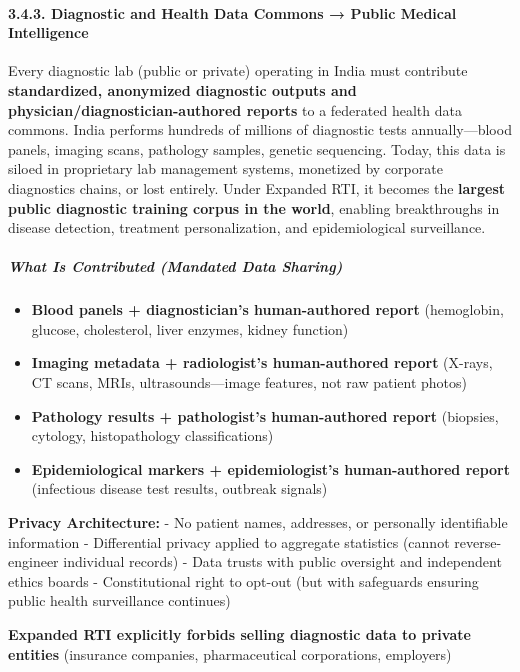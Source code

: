 \paragraph{3.4.3. Diagnostic and Health Data Commons → Public Medical
Intelligence}\label{diagnostic-and-health-data-commons-public-medical-intelligence}

Every diagnostic lab (public or private) operating in India must
contribute \textbf{standardized, anonymized diagnostic outputs and
physician/diagnostician-authored reports} to a federated health data
commons. India performs hundreds of millions of diagnostic tests
annually---blood panels, imaging scans, pathology samples, genetic
sequencing. Today, this data is siloed in proprietary lab management
systems, monetized by corporate diagnostics chains, or lost entirely.
Under Expanded RTI, it becomes the \textbf{largest public diagnostic
training corpus in the world}, enabling breakthroughs in disease
detection, treatment personalization, and epidemiological surveillance.

\subparagraph{What Is Contributed (Mandated Data
Sharing)}\label{what-is-contributed-mandated-data-sharing}

\begin{itemize}
\tightlist
\item
  \textbf{Blood panels + diagnostician's human-authored report}
  (hemoglobin, glucose, cholesterol, liver enzymes, kidney function)
\item
  \textbf{Imaging metadata + radiologist's human-authored report}
  (X-rays, CT scans, MRIs, ultrasounds---image features, not raw patient
  photos)
\item
  \textbf{Pathology results + pathologist's human-authored report}
  (biopsies, cytology, histopathology classifications)
\item
  \textbf{Epidemiological markers + epidemiologist's human-authored
  report} (infectious disease test results, outbreak signals)
\end{itemize}

\textbf{Privacy Architecture:} - No patient names, addresses, or
personally identifiable information - Differential privacy applied to
aggregate statistics (cannot reverse-engineer individual records) - Data
trusts with public oversight and independent ethics boards -
Constitutional right to opt-out (but with safeguards ensuring public
health surveillance continues)

\textbf{Expanded RTI explicitly forbids selling diagnostic data to
private entities} (insurance companies, pharmaceutical corporations,
employers)

